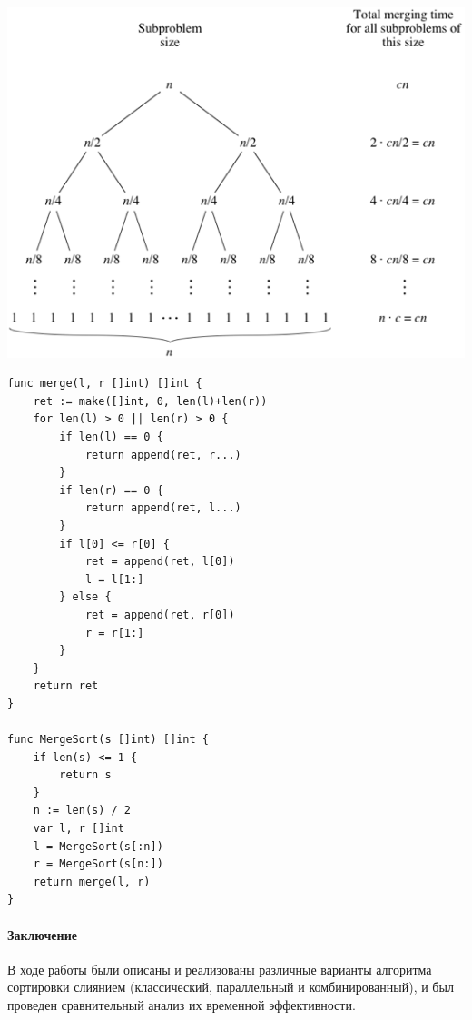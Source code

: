 \documentclass[utf8x, 12pt]{G7-32} %
\begin{document}
\begin{center}
	\includegraphics{images/mergeSortTree.png}
\end{center}

\begin{lstlisting}
func merge(l, r []int) []int {
	ret := make([]int, 0, len(l)+len(r))
	for len(l) > 0 || len(r) > 0 {
		if len(l) == 0 {
			return append(ret, r...)
		}
		if len(r) == 0 {
			return append(ret, l...)
		}
		if l[0] <= r[0] {
			ret = append(ret, l[0])
			l = l[1:]
		} else {
			ret = append(ret, r[0])
			r = r[1:]
		}
	}
	return ret
}

func MergeSort(s []int) []int {
	if len(s) <= 1 {
		return s
	}
	n := len(s) / 2
	var l, r []int
	l = MergeSort(s[:n])
	r = MergeSort(s[n:])
	return merge(l, r)
}
\end{lstlisting}

\paragraph{Заключение}

В ходе работы были описаны и реализованы различные варианты алгоритма сортировки слиянием (классический, параллельный и комбинированный), и был проведен сравнительный анализ их временной эффективности.

\backmatter %

\appendix   %
\end{document}
